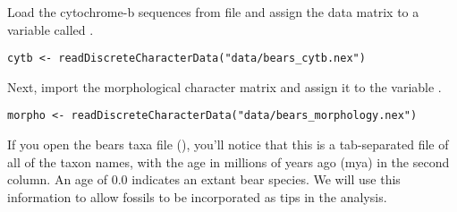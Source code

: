 Load the cytochrome-b sequences from file and assign the data matrix to a variable called .
{\tt \begin{snugshade*}
\begin{lstlisting}
cytb <- readDiscreteCharacterData("data/bears_cytb.nex") 
\end{lstlisting}
\end{snugshade*}}

Next, import the morphological character matrix and assign it to the variable . 
{\tt \begin{snugshade*}
\begin{lstlisting}
morpho <- readDiscreteCharacterData("data/bears_morphology.nex")
\end{lstlisting}
\end{snugshade*}}

%


If you open the bears taxa file (), you'll notice that this is a tab-separated file of all of the taxon names, with the age in millions of years ago (mya) in the second column. 
An age of 0.0 indicates an extant bear species. 
We will use this information to allow fossils to be incorporated as tips in the analysis. 

